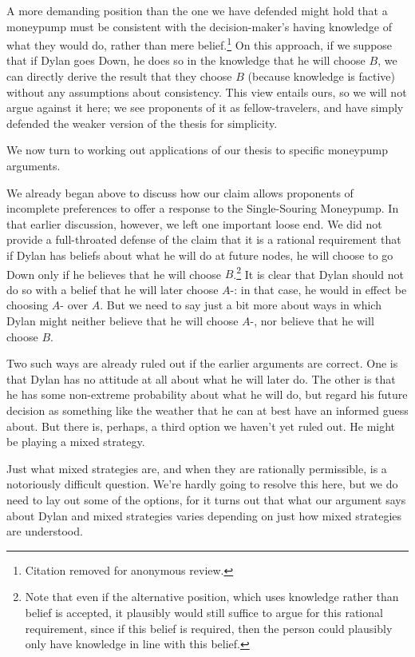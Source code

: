 \documentclass[
  11pt,
  letterpaper]{article}
\begin{document}
A more demanding position than the one we have defended might hold that a moneypump must be consistent with the decision-maker's having knowledge of what they would do, rather than mere belief.\footnote{Citation removed for anonymous review.} On this approach, if we suppose that if Dylan goes Down, he does so in the knowledge that he will choose $B$, we can directly derive the result that they choose $B$ (because knowledge is factive) without any assumptions about consistency. This view entails ours, so we will not argue against it here; we see proponents of it as fellow-travelers, and have simply defended the weaker version of the thesis for simplicity. 

We now turn to working out applications of our thesis to specific moneypump arguments.

We already began above to discuss how our claim allows proponents of incomplete preferences to offer a response to the Single-Souring Moneypump. In that earlier discussion, however, we left one important loose end. We did not provide a full-throated defense of the claim that it is a rational requirement that if Dylan has beliefs about what he will do at future nodes, he will choose to go Down only if he believes that he will choose $B$.\footnote{Note that even if the alternative position, which uses knowledge rather than belief is accepted, it plausibly would still suffice to argue for this rational requirement, since if this belief is required, then the person could plausibly only have knowledge in line with this belief.} It is clear that Dylan should not do so with a belief that he will later choose $A$-: in that case, he would in effect be choosing $A$- over $A$. But we need to say just a bit more about ways in which Dylan might neither believe that he will choose $A$-, nor believe that he will choose $B$.

Two such ways are already ruled out if the earlier arguments are correct. One is that Dylan has no attitude at all about what he will later do. The other is that he has some non-extreme probability about what he will do, but regard his future decision as something like the weather that he can at best have an informed guess about. But there is, perhaps, a third option we haven't yet ruled out. He might be playing a mixed strategy.

Just what mixed strategies are, and when they are rationally permissible, is a notoriously difficult question. We're hardly going to resolve this here, but we do need to lay out some of the options, for it turns out that what our argument says about Dylan and mixed strategies varies depending on just how mixed strategies are understood.
\end{document}
